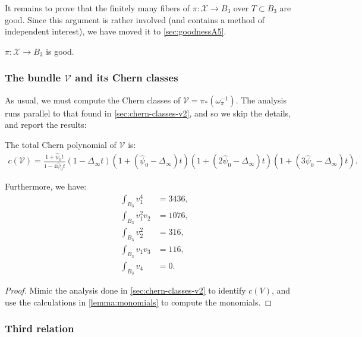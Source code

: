\documentclass[12pt,reqno]{amsart}
\renewcommand{\to}{{\longrightarrow}}
\numberwithin{equation}{section}
\newcommand{\V}{\mathcal V}
\newcommand{\cX}{\mathcal{X}}
\newcommand{\hpsi}{\widehat{\psi}}
\begin{document}
  
It remains to prove that the finitely many fibers of
$\pi: \mathcal{X} \to B_{3}$ over $T \subset B_{3}$ are good.  Since
this argument is rather involved (and contains a method of independent
interest), we have moved it to \autoref{sec:goodnessA5}.

\begin{corollary}
  \label{cor:good3} $\pi: \cX \to B_{3}$ is good.
\end{corollary}

\subsubsection{The bundle $\V$ and its Chern classes}
\label{sec:bundle-v3}

As usual, we must compute the Chern classes of
$\V = \pi_{*}\left( \omega_{\pi}^{-1} \right)$.  The analysis runs
parallel to that found in \autoref{sec:chern-classes-v2}, and so we
skip the details, and report the results:

\begin{proposition}
  \label{prop:chernV3} The total Chern polynomial of $\V$ is:
  \begin{align}
    \label{eq:chernV3}
    c(\V) = \frac{1+\hpsi_{0}t}{1-4 \hpsi_{0}t}\left(1-\Delta_{\infty}t \right) \left(1 + (\hpsi_{0}-\Delta_{\infty})t \right)  \left(1 + (2\hpsi_{0}-\Delta_{\infty})t \right) \left(1 + (3\hpsi_{0}-\Delta_{\infty})t \right).
  \end{align}

  Furthermore, we have:
  \begin{align}
    \label{eq:monomialsV3}
    \int_{B_{3}}v_{1}^{4}& = 3436, \\ \nonumber
    \int_{B_{3}} v_{1}^{2}v_{2}& = 1076,\\ \nonumber
    \int_{B_{3}} v_{2}^{2}& = 316, \\ \nonumber
    \int_{B_{3}} v_{1}v_{3}& = 116, \\ \nonumber
    \int_{B_{3}} v_{4}& = 0. \nonumber
  \end{align}
\end{proposition}

\begin{proof}
  Mimic the analysis done in \autoref{sec:chern-classes-v2} to
  identify $c(V)$, and use the calculations in
  \autoref{lemma:monomials} to compute the monomials.
\end{proof}

\subsubsection{Third relation}
\label{sec:third-relation}
\end{document}
